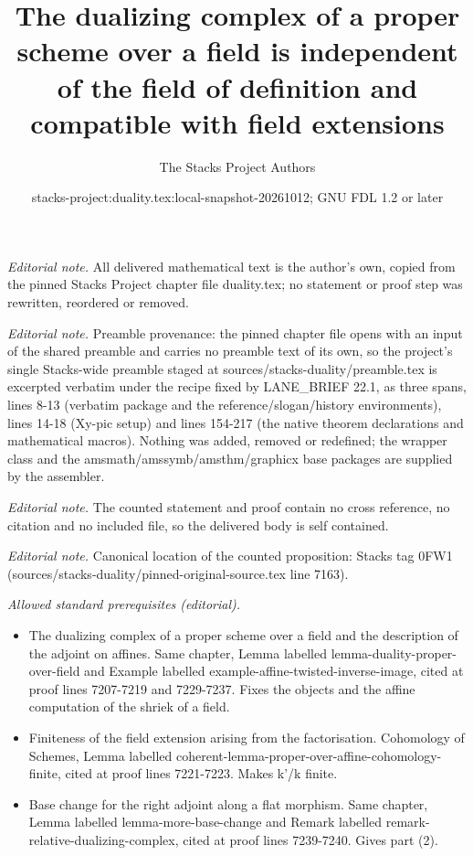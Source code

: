 \documentclass[10pt,a4paper]{amsart}
\title{The dualizing complex of a proper scheme over a field is independent of the field of definition and compatible with field extensions}
\author{The Stacks Project Authors}
\date{stacks-project:duality.tex:local-snapshot-20261012; GNU FDL 1.2 or later}
\theoremstyle{plain}
\theoremstyle{definition}
\theoremstyle{remark}
\numberwithin{equation}{subsection}
\begin{document}
\maketitle
\noindent\textit{Editorial note.} All delivered mathematical text is the author's own, copied from the pinned Stacks Project chapter file duality.tex; no statement or proof step was rewritten, reordered or removed.\par\medskip
\noindent\textit{Editorial note.} Preamble provenance: the pinned chapter file opens with an input of the shared preamble and carries no preamble text of its own, so the project's single Stacks-wide preamble staged at sources/stacks-duality/preamble.tex is excerpted verbatim under the recipe fixed by LANE\_BRIEF 22.1, as three spans, lines 8-13 (verbatim package and the reference/slogan/history environments), lines 14-18 (Xy-pic setup) and lines 154-217 (the native theorem declarations and mathematical macros). Nothing was added, removed or redefined; the wrapper class and the amsmath/amssymb/amsthm/graphicx base packages are supplied by the assembler.\par\medskip
\noindent\textit{Editorial note.} The counted statement and proof contain no cross reference, no citation and no included file, so the delivered body is self contained.\par\medskip
\noindent\textit{Editorial note.} Canonical location of the counted proposition: Stacks tag 0FW1 (sources/stacks-duality/pinned-original-source.tex line 7163).\par\medskip
\noindent\textit{Allowed standard prerequisites (editorial).}\begin{itemize}
\item The dualizing complex of a proper scheme over a field and the description of the adjoint on affines. Same chapter, Lemma labelled lemma-duality-proper-over-field and Example labelled example-affine-twisted-inverse-image, cited at proof lines 7207-7219 and 7229-7237. Fixes the objects and the affine computation of the shriek of a field.
\item Finiteness of the field extension arising from the factorisation. Cohomology of Schemes, Lemma labelled coherent-lemma-proper-over-affine-cohomology-finite, cited at proof lines 7221-7223. Makes k'/k finite.
\item Base change for the right adjoint along a flat morphism. Same chapter, Lemma labelled lemma-more-base-change and Remark labelled remark-relative-dualizing-complex, cited at proof lines 7239-7240. Gives part (2).
\end{itemize}\medskip
\end{document}
